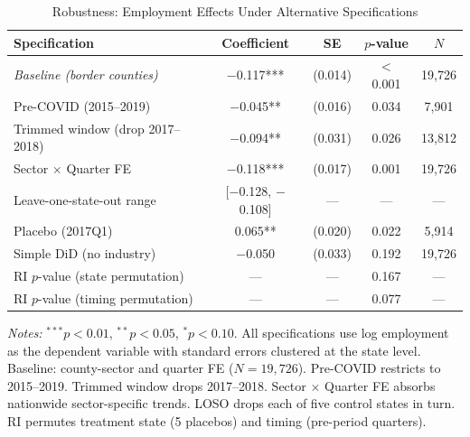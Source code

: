 \begin{table}[htbp]
\centering
\caption{Robustness: Employment Effects Under Alternative Specifications}
\label{tab:robust}
\begin{tabular}{lcccc}
\toprule
Specification & Coefficient & SE & $p$-value & $N$ \\
\midrule
\textit{Baseline (border counties)} & $-$0.117*** & (0.014) & $<$0.001 & 19,726 \\
Pre-COVID (2015--2019) & $-$0.045** & (0.016) & 0.034 & 7,901 \\
Trimmed window (drop 2017--2018) & $-$0.094** & (0.031) & 0.026 & 13,812 \\
Sector $\times$ Quarter FE & $-$0.118*** & (0.017) & 0.001 & 19,726 \\
Leave-one-state-out range & [$-$0.128, $-$0.108] & --- & --- & --- \\
Placebo (2017Q1) & 0.065** & (0.020) & 0.022 & 5,914 \\
Simple DiD (no industry) & $-$0.050 & (0.033) & 0.192 & 19,726 \\
RI $p$-value (state permutation) & --- & --- & 0.167 & --- \\
RI $p$-value (timing permutation) & --- & --- & 0.077 & --- \\
\bottomrule
\end{tabular}
\begin{tablenotes}[flushleft]
\small
\item \textit{Notes:} $^{***}p<0.01$, $^{**}p<0.05$, $^{*}p<0.10$. All specifications use log employment as the dependent variable with standard errors clustered at the state level. Baseline: county-sector and quarter FE ($N = 19{,}726$). Pre-COVID restricts to 2015--2019. Trimmed window drops 2017--2018. Sector $\times$ Quarter FE absorbs nationwide sector-specific trends. LOSO drops each of five control states in turn. RI permutes treatment state (5 placebos) and timing (pre-period quarters).\end{tablenotes}
\end{table}
